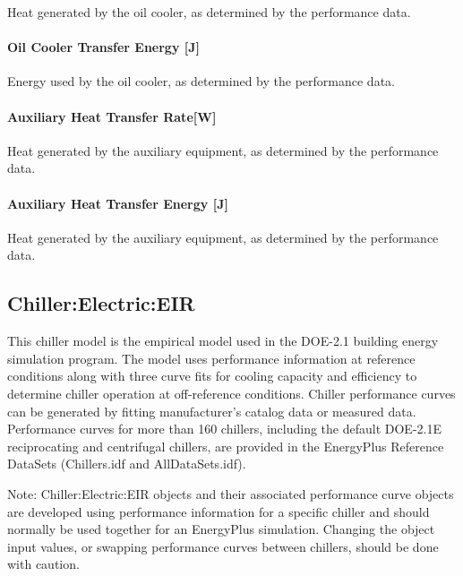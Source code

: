 Heat generated by the oil cooler, as determined by the performance data.

\paragraph{Oil Cooler Transfer Energy {[}J{]}}\label{chiller205-oil-cooler-heat-transfer-energy}

Energy used by the oil cooler, as determined by the performance data.

\paragraph{Auxiliary Heat Transfer Rate{[}W{]}}\label{chiller205-auxiliary-heat-transfer-rate}

Heat generated by the auxiliary equipment, as determined by the performance data.

\paragraph{Auxiliary Heat Transfer Energy {[}J{]}}\label{chiller205-auxiliary-heat-transfer-energy}

Heat generated by the auxiliary equipment, as determined by the performance data.

\subsection{Chiller:Electric:EIR}\label{chillerelectriceir}

This chiller model is the empirical model used in the DOE-2.1 building energy simulation program. The model uses performance information at reference conditions along with three curve fits for cooling capacity and efficiency to determine chiller operation at off-reference conditions. Chiller performance curves can be generated by fitting manufacturer's catalog data or measured data. Performance curves for more than 160 chillers, including the default DOE-2.1E reciprocating and centrifugal chillers, are provided in the EnergyPlus Reference DataSets (Chillers.idf and AllDataSets.idf).

Note: Chiller:Electric:EIR objects and their associated performance curve objects are developed using performance information for a specific chiller and should normally be used together for an EnergyPlus simulation. Changing the object input values, or swapping performance curves between chillers, should be done with caution.

